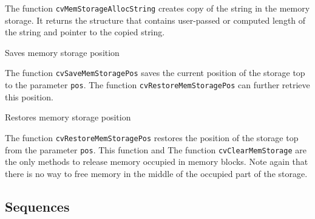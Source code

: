 The function \texttt{cvMemStorageAllocString} creates copy of the string
in the memory storage. It returns the structure that contains user-passed
or computed length of the string and pointer to the copied string.

\label{SaveMemStoragePos}

Saves memory storage position


\begin{description}
\end{description}

The function \texttt{cvSaveMemStoragePos} saves the current position
of the storage top to the parameter \texttt{pos}. The function
\texttt{cvRestoreMemStoragePos} can further retrieve this position.

\label{RestoreMemStoragePos}

Restores memory storage position


\begin{description}
\end{description}

The function \texttt{cvRestoreMemStoragePos} restores the position of the storage top from the parameter \texttt{pos}. This function and The function \texttt{cvClearMemStorage} are the only methods to release memory occupied in memory blocks. Note again that there is no way to free memory in the middle of the occupied part of the storage.

\subsection{Sequences}

\label{CvSeq}

